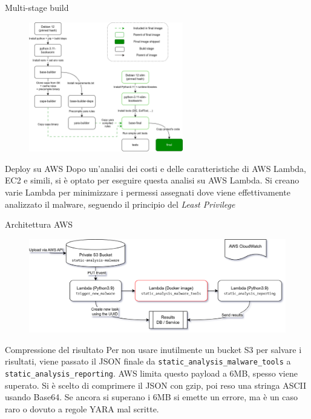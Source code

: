 \begin{frame}{Multi-stage build}

\begin{figure}
    \centering
    \includegraphics[width=0.6\textwidth]{images/dockerfile.png}
\end{figure}
\end{frame}

\begin{frame}{Deploy su AWS}
Dopo un'analisi dei costi e delle caratteristiche di AWS Lambda, EC2 e simili, si è optato per eseguire questa analisi su AWS Lambda.
\vfill
Si creano varie Lambda per minimizzare i permessi assegnati dove viene effettivamente analizzato il malware, seguendo il principio del \emph{Least Privilege}
\end{frame}

\begin{frame}{Architettura AWS}
\begin{figure}
    \centering
    \includegraphics[width=\textwidth]{images/aws_static_lambdas_architecture.png}
\end{figure}
\end{frame}

\begin{frame}{Compressione del risultato}
Per non usare inutilmente un bucket S3 per salvare i risultati, viene passato il JSON finale da \texttt{static\_analysis\_malware\_tools} a \texttt{static\_analysis\_reporting}.
\vfill
AWS limita questo payload a 6MB, spesso viene superato.
\vfill
Si è scelto di comprimere il JSON con gzip, poi reso una stringa ASCII usando Base64.
Se ancora si superano i 6MB si emette un errore, ma è un caso raro o dovuto a regole YARA mal scritte.
\end{frame}

